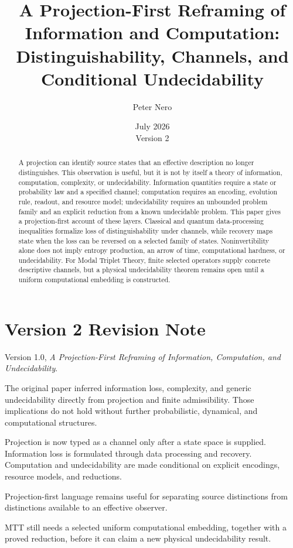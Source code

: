 \documentclass[11pt]{article}
\title{A Projection-First Reframing of Information and Computation:\\
\large Distinguishability, Channels, and Conditional Undecidability}
\author{Peter Nero}
\date{July 2026\\Version 2}
\begin{document}
\maketitle

\begin{abstract}
A projection can identify source states that an effective description no
longer distinguishes. This observation is useful, but it is not by itself a
theory of information, computation, complexity, or undecidability.
Information quantities require a state or probability law and a specified
channel; computation requires an encoding, evolution rule, readout, and
resource model; undecidability requires an unbounded problem family and an
explicit reduction from a known undecidable problem. This paper gives a
projection-first account of these layers. Classical and quantum
data-processing inequalities formalize loss of distinguishability under
channels, while recovery maps state when the loss can be reversed on a
selected family of states. Noninvertibility alone does not imply entropy
production, an arrow of time, computational hardness, or undecidability.
For Modal Triplet Theory, finite selected operators supply concrete
descriptive channels, but a physical undecidability theorem remains open
until a uniform computational embedding is constructed.
\end{abstract}

\section*{Version 2 Revision Note}
\begin{description}[leftmargin=3.2cm,style=nextline]
\item[Supersedes] Version 1.0, \emph{A Projection-First Reframing of
Information, Computation, and Undecidability}.
\item[Reason] The original paper inferred information loss, complexity, and
generic undecidability directly from projection and finite admissibility.
Those implications do not hold without further probabilistic, dynamical,
and computational structures.
\item[Resolution] Projection is now typed as a channel only after a state
space is supplied. Information loss is formulated through data processing
and recovery. Computation and undecidability are made conditional on
explicit encodings, resource models, and reductions.
\item[Retained result] Projection-first language remains useful for
separating source distinctions from distinctions available to an effective
observer.
\item[Remaining boundary] MTT still needs a selected uniform computational
embedding, together with a proved reduction, before it can claim a new
physical undecidability result.
\end{description}
\end{document}
